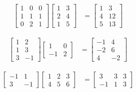 \documentclass[a4paper,norsk,12pt]{article}
\begin{document}
\begin{align*}
  \left[
    \begin{array}{ccc}
      1 & 0 & 0 \\
      1 & 1 & 1 \\
      0 & 2 & 1
    \end{array}
  \right]
  \left[
    \begin{array}{ccc}
      1 & 3 \\
      2 & 4 \\
      1 & 5
    \end{array}
  \right]
  &=
  \left[
    \begin{array}{ccc}
      1 & 3 \\
      4 & 12 \\
      5 & 13
    \end{array}
  \right]
\end{align*}

\begin{align*}
  \left[
    \begin{array}{ccc}
      1 &  2 \\
      1 &  3 \\
      3 & -1
    \end{array}
  \right]
  \left[
    \begin{array}{ccc}
      1 & 0 \\
     -1 & 2
    \end{array}
  \right]
  &=
  \left[
    \begin{array}{ccc}
     -1 & 4 \\
     -2 & 6 \\
      4 & -2
    \end{array}
  \right]
\end{align*}

\begin{align*}
  \left[
    \begin{array}{ccc}
     -1 &  1 \\
      3 & -1
    \end{array}
  \right]
  \left[
    \begin{array}{ccc}
      1 & 2 & 3 \\
      4 & 5 & 6
    \end{array}
  \right]
  &=
  \left[
    \begin{array}{ccc}
      3 & 3 & 3 \\
      -1 & 1 & 3
    \end{array}
  \right]
\end{align*}
\end{document}
